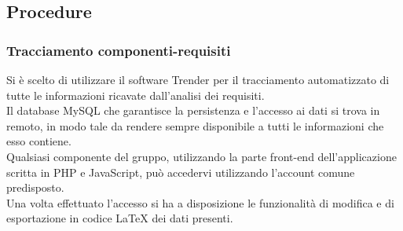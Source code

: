 \documentclass[NormeDiProgetto.tex]{subfiles}
\begin{document}






\subsection{Procedure}

\subsubsection{Tracciamento componenti-requisiti}
	Si è scelto di utilizzare il software Trender per il tracciamento automatizzato di tutte le informazioni ricavate dall'analisi dei requisiti.\\
	Il database MySQL che garantisce la persistenza e l'accesso ai dati si trova in remoto, in modo tale da rendere sempre disponibile a tutti le informazioni che esso contiene.\\
	Qualsiasi componente del gruppo, utilizzando la parte front-end dell'applicazione scritta in PHP e JavaScript, può accedervi utilizzando l'account comune predisposto.\\
	Una volta effettuato l'accesso si ha a disposizione le funzionalità di modifica e di esportazione in codice LaTeX dei dati presenti.\\
\end{document}
